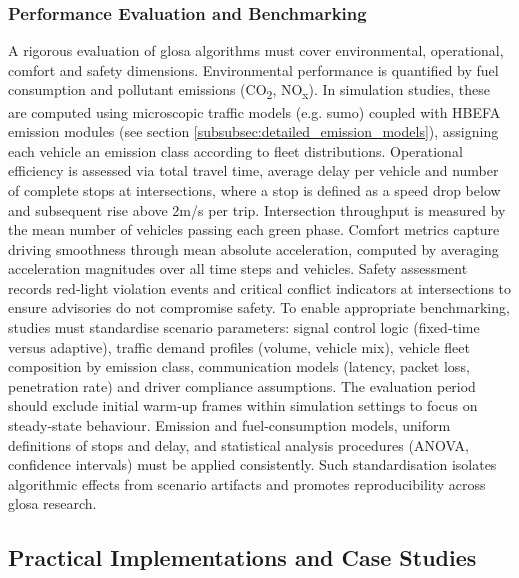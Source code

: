 \subsubsection{Performance Evaluation and Benchmarking}
\label{subsubsec:performance_evaluation}

A rigorous evaluation of \ac{glosa} algorithms must cover environmental, operational, comfort and safety dimensions. Environmental performance is quantified by fuel consumption and pollutant emissions (CO\textsubscript{2}, NO\textsubscript{x}). \cite{Kloeppel2019,Lenz2024} In simulation studies, these are computed using microscopic traffic models (e.g. \ac{sumo}) coupled with HBEFA emission modules (see section \ref{subsubsec:detailed_emission_models}), assigning each vehicle an emission class according to fleet distributions. Operational efficiency is assessed via total travel time, average delay per vehicle and number of complete stops at intersections, where a stop is defined as a speed drop below and subsequent rise above 2m/s per trip. Intersection throughput is measured by the mean number of vehicles passing each green phase. Comfort metrics capture driving smoothness through mean absolute acceleration, computed by averaging acceleration magnitudes over all time steps and vehicles. Safety assessment records red‐light violation events and critical conflict indicators at intersections to ensure advisories do not compromise safety. \cite{Kloeppel2019,Lenz2024}
\mynewline
To enable appropriate benchmarking, studies must standardise scenario parameters: signal control logic (fixed‐time versus adaptive)\cite{Kloeppel2020}, traffic demand profiles (volume, vehicle mix), vehicle fleet composition by emission class, communication models (latency, packet loss, penetration rate) and driver compliance assumptions. The evaluation period should exclude initial warm‐up frames within simulation settings to focus on steady‐state behaviour. \cite{Lenz2024} Emission and fuel‐consumption models, uniform definitions of stops and delay, and statistical analysis procedures (ANOVA, confidence intervals) must be applied consistently. \cite{Kloeppel2019} Such standardisation isolates algorithmic effects from scenario artifacts and promotes reproducibility across \ac{glosa} research. \cite{Kloeppel2020}


\subsection{Practical Implementations and Case Studies}
\label{subsec:practical_implementations}

